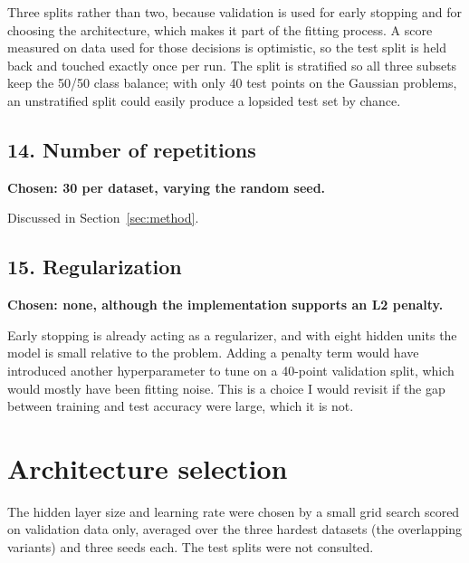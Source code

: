 \documentclass[11pt]{article}
\begin{document}
Three splits rather than two, because validation is used for early stopping and
for choosing the architecture, which makes it part of the fitting process. A
score measured on data used for those decisions is optimistic, so the test split
is held back and touched exactly once per run. The split is stratified so all
three subsets keep the 50/50 class balance; with only 40 test points on the
Gaussian problems, an unstratified split could easily produce a lopsided test
set by chance.

\subsection*{14. Number of repetitions}
\textbf{Chosen: 30 per dataset, varying the random seed.}

Discussed in Section~\ref{sec:method}.

\subsection*{15. Regularization}
\textbf{Chosen: none, although the implementation supports an L2 penalty.}

Early stopping is already acting as a regularizer, and with eight hidden units
the model is small relative to the problem. Adding a penalty term would have
introduced another hyperparameter to tune on a 40-point validation split, which
would mostly have been fitting noise. This is a choice I would revisit if the
gap between training and test accuracy were large, which it is not.

\section{Architecture selection}
\label{sec:arch}

The hidden layer size and learning rate were chosen by a small grid search
scored on validation data only, averaged over the three hardest datasets (the
overlapping variants) and three seeds each. The test splits were not consulted.
\end{document}
